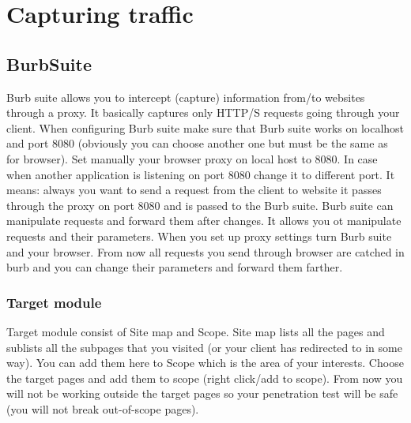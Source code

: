 \section{Capturing traffic}
\label{sec:traffic}

\subsection{BurbSuite}
\label{subsec:burp}

Burb suite allows you to intercept (capture) information from/to websites through a proxy.
It basically captures only HTTP/S requests going through your client.
When configuring Burb suite make sure that Burb suite works on localhost and port 8080 (obviously you can choose another one but must be the same as for browser).
Set manually your browser proxy on local host to 8080.
In case when another application is listening on port 8080 change it to different port.
It means: always you want to send a request from the client to website it passes through the proxy on port 8080 and is passed to the Burb suite.
Burb suite can manipulate requests and forward them after changes.
It allows you ot manipulate requests and their parameters.
When you set up proxy settings turn Burb suite and your browser.
From now all requests you send through browser are catched in burb and you can change their parameters and forward them farther.


\newline
{}
\newline
{}
\newline
{}
\newline
{}
\newline
{}
\newline
{}
\newline
{}
\newline
{}
\newline
{}
\newline
{}
\newline
{}
\newline
{}

\subsubsection{Target module}
Target module consist of Site map and Scope.
Site map lists all the pages and sublists all the subpages that you visited (or your client has redirected to in some way).
You can add them here to Scope which is the area of your interests.
Choose the target pages and add them to scope (right click/add to scope).
From now you will not be working outside the target pages so your penetration test will be safe (you will not break out-of-scope pages).

